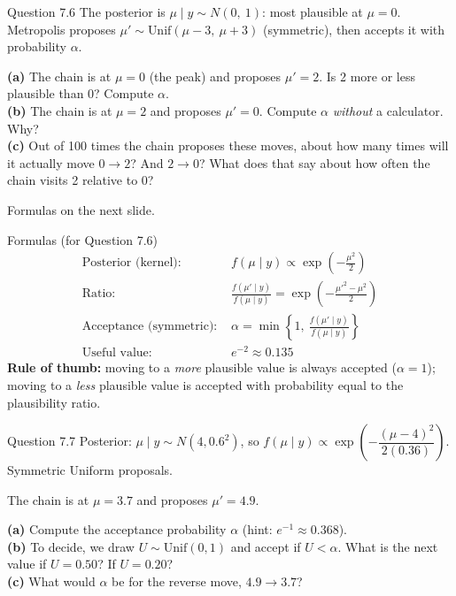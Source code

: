 \documentclass[aspectratio=43,11pt]{beamer}
\begin{document}
\begin{frame}{Question 7.6}
  The posterior is $\mu \mid y \sim N(0,\ 1)$: most
  plausible at $\mu = 0$. Metropolis proposes
  $\mu' \sim \text{Unif}(\mu - 3,\ \mu + 3)$ (symmetric), then accepts it
  with probability $\alpha$.
  \vspace{0.5em}

  \textbf{(a)} The chain is at $\mu = 0$ (the peak) and proposes
  $\mu' = 2$. Is 2 more or less plausible than 0? Compute $\alpha$.
  \\[0.3em]
  \textbf{(b)} The chain is at $\mu = 2$ and proposes $\mu' = 0$.
  Compute $\alpha$ \emph{without} a calculator. Why?
  \\[0.3em]
  \textbf{(c)} Out of 100 times the chain proposes these moves, about how
  many times will it actually move $0 \to 2$? And $2 \to 0$?
  What does that say about how often the chain visits 2 relative to 0?
  \vspace{0.3em}

  \footnotesize Formulas on the next slide.
\end{frame}

\begin{frame}{Formulas (for Question 7.6)}
  \footnotesize
  \begin{align*}
  \text{Posterior (kernel): } & f(\mu \mid y) \propto
    \exp\!\left(-\frac{\mu^2}{2}\right) \\[4pt]
  \text{Ratio: } &
    \frac{f(\mu' \mid y)}{f(\mu \mid y)} =
    \exp\!\left(-\frac{\mu'^2-\mu^2}{2}\right) \\[4pt]
  \text{Acceptance (symmetric): } & \alpha =
    \min\left\{1,\ \frac{f(\mu' \mid y)}{f(\mu \mid y)}\right\} \\[4pt]
  \text{Useful value: } & e^{-2} \approx 0.135
  \end{align*}
  \vspace{0.3em}
  \textbf{Rule of thumb:} moving to a \emph{more} plausible value is
  always accepted ($\alpha = 1$); moving to a \emph{less} plausible value
  is accepted with probability equal to the plausibility ratio.
\end{frame}

\begin{frame}{Question 7.7}
  Posterior: $\mu \mid y \sim N(4, 0.6^2)$, so
  $f(\mu \mid y) \propto \exp\!\left(-\dfrac{(\mu - 4)^2}{2(0.36)}\right)$.
  Symmetric Uniform proposals.
  \vspace{0.6em}

  The chain is at $\mu = 3.7$ and proposes $\mu' = 4.9$.
  \vspace{0.3em}

  \textbf{(a)} Compute the acceptance probability $\alpha$
  (hint: $e^{-1} \approx 0.368$). \\[0.3em]
  \textbf{(b)} To decide, we draw $U \sim \text{Unif}(0,1)$ and accept if
  $U < \alpha$. What is the next value if $U = 0.50$? If $U = 0.20$? \\[0.3em]
  \textbf{(c)} What would $\alpha$ be for the reverse move, $4.9 \to 3.7$?
\end{frame}
\end{document}
